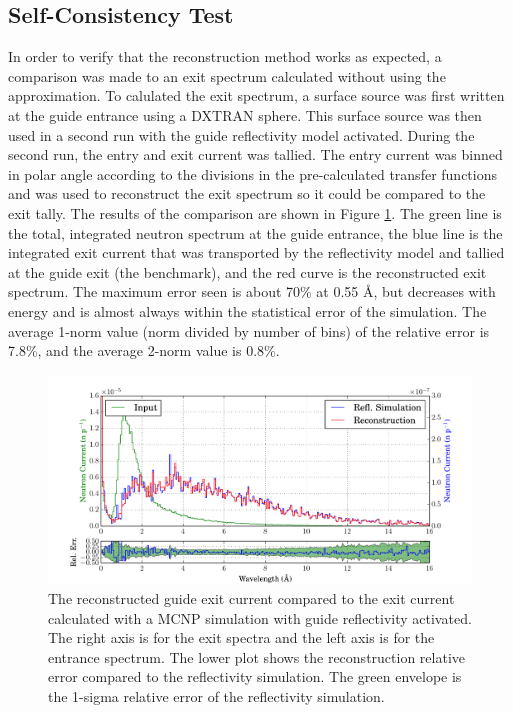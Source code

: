 \documentclass[a4paper]{jpconf}
\begin{document}
\subsection{Self-Consistency Test}

In order to verify that the reconstruction method works as expected, a comparison was made to an exit spectrum calculated without using the approximation.  To calulated the exit spectrum, a surface source was first written at the guide entrance using a DXTRAN sphere. This surface source was then used in a second run with the guide reflectivity model activated.  During the second run, the entry and exit current was tallied.  The entry current was binned in polar angle according to the divisions in the pre-calculated transfer functions and was used to reconstruct the exit spectrum so it could be compared to the exit tally.   The results of the comparison are shown in Figure \ref{xfer_bench}.  The green line is the total, integrated neutron spectrum at the guide entrance, the blue line is the integrated exit current that was transported by the reflectivity model and tallied at the guide exit (the benchmark), and the red curve is the reconstructed exit spectrum.  The maximum error seen is about 70\% at 0.55 \AA{}, but decreases with energy and is almost always within the statistical error of the simulation.  The average 1-norm value (norm divided by number of bins) of the relative error is 7.8\%, and the average 2-norm value is 0.8\%.

\begin{figure}
\begin{center}
\includegraphics[scale=0.5]{graphics/xfer_bench.pdf}
\end{center}
\caption{\label{xfer_bench}The reconstructed guide exit current compared to the exit current calculated with a MCNP simulation with guide reflectivity activated.  The right axis is for the exit spectra and the left axis is for the entrance spectrum.  The lower plot shows the reconstruction relative error compared to the reflectivity simulation.  The green envelope is the 1-sigma relative error of the reflectivity simulation.}
\end{figure}
\end{document}

